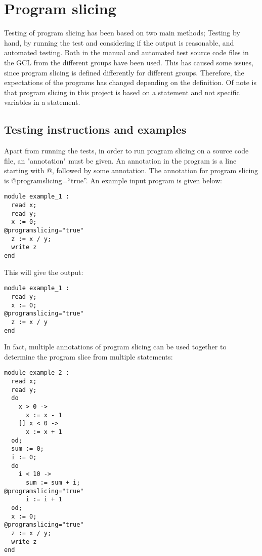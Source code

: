 \section{Program slicing}

Testing of program slicing has been based on two main methods;
Testing by hand, by running the test and considering if the output
is reasonable, and automated testing. Both in the manual and automated
test source code files in the GCL from the different groups have been
used. This has caused some issues, since program slicing is defined
differently for different groups. Therefore, the expectations of the
programs has changed depending on the definition.
Of note is that program slicing in this project is based on a statement
and not specific variables in a statement.

\subsection{Testing instructions and examples}

Apart from running the tests, in order to run program slicing
on a source code file, an "annotation" must be given. An annotation in the program
is a line starting with @, followed by some annotation.
The annotation for program slicing is @programslicing=``true''.
An example input program is given below:

\begin{lstlisting}
module example_1 :
  read x;
  read y;
  x := 0;
@programslicing="true"
  z := x / y;
  write z
end
\end{lstlisting}

This will give the output:

\begin{lstlisting}
module example_1 :
  read y;
  x := 0;
@programslicing="true"
  z := x / y
end
\end{lstlisting}

In fact, multiple annotations of program slicing can be used together
to determine the program slice from multiple statements:

\begin{lstlisting}
module example_2 :
  read x;
  read y;
  do
    x > 0 ->
      x := x - 1
    [] x < 0 ->
      x := x + 1
  od;
  sum := 0;
  i := 0;
  do
    i < 10 ->
      sum := sum + i;
@programslicing="true"
      i := i + 1
  od;
  x := 0;
@programslicing="true"
  z := x / y;
  write z
end
\end{lstlisting}

